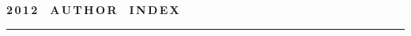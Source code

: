 \def\stat{cont-e}
{%
\raggedleft\Large \bf%
2\,0\,1\,2\ \ A\,U\,T\,H\,O\,R\ \ I\,N\,D\,E\,X \vskip 17pt
    \hrule
    \par
{} }

\label{st\stat}

\def\tit{\ }

\def\aut{\ }
\def\auf{\ }

\def\leftkol{\ } %

\def\rightkol{\ } %

\titele{\tit}{\aut}{\auf}{\leftkol}{\rightkol}

\vspace*{-12pt}

